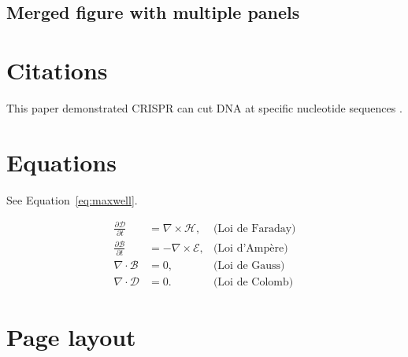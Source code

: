 \subsection{Merged figure with multiple panels}





\section{Citations}
This paper demonstrated CRISPR can cut DNA at specific nucleotide sequences \cite{Jinek2012}.


\section{Equations}
See Equation~\ref{eq:maxwell}.

\begin{equation}
    \label{eq:maxwell}
    \begin{aligned}
    \frac{\partial\mathcal{D}}{\partial t} & = \nabla\times\mathcal{H},   & \text{(Loi de Faraday)}\\
    \frac{\partial\mathcal{B}}{\partial t} & = -\nabla\times\mathcal{E},  & \text{(Loi d'Ampère)}\\
    \nabla\cdot\mathcal{B}                 & = 0,                         & \text{(Loi de Gauss)}\\
    \nabla\cdot\mathcal{D}                 & = 0.                         & \text{(Loi de Colomb)}
    \end{aligned}
\end{equation}

\clearpage
\section{Page layout}
\layout
